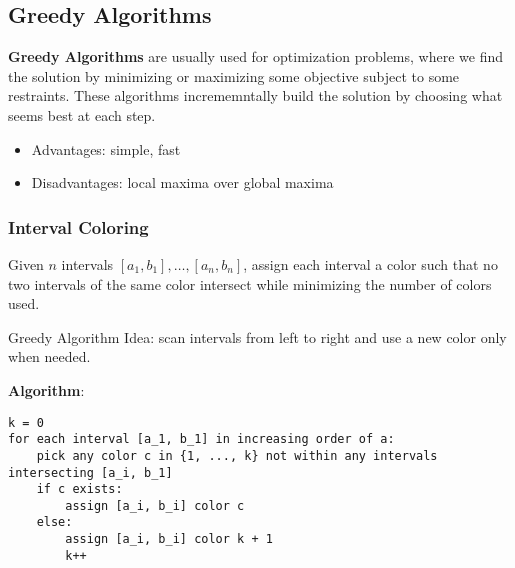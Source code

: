 \documentclass[12pt]{article}
\begin{document}
\subsection{Greedy Algorithms}
{\bf Greedy Algorithms} are usually used for optimization problems, where we find the solution by minimizing or maximizing some objective subject to some restraints. These algorithms incrememntally build the solution by choosing what seems best at each step.
\begin{itemize}
\item Advantages: simple, fast
\item Disadvantages: local maxima over global maxima
\end{itemize}


\subsubsection{Interval Coloring}
\begin{example}
Given $n$ intervals $[a_1, b_1], \dots, [a_n, b_n]$, assign each interval a color such that no two intervals of the same color intersect while minimizing the number of colors used.

Greedy Algorithm Idea: scan intervals from left to right and use a new color only when needed.

{\bf Algorithm}:
\begin{verbatim}
k = 0
for each interval [a_1, b_1] in increasing order of a:
    pick any color c in {1, ..., k} not within any intervals intersecting [a_i, b_1]
    if c exists:
        assign [a_i, b_i] color c
    else:
        assign [a_i, b_i] color k + 1
        k++
\end{verbatim}
\end{example}

\end{document}
